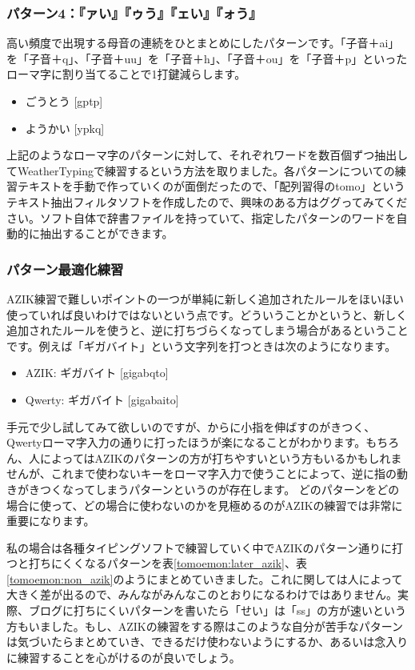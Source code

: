 \subsubsection*{パターン4：『ァい』『ゥう』『ェい』『ォう』}
高い頻度で出現する母音の連続をひとまとめにしたパターンです。「子音＋ai」を「子音＋q」、「子音＋uu」を「子音＋h」、「子音＋ou」を「子音＋p」といったローマ字に割り当てることで1打鍵減らします。
\begin{itemize}
 \item ごうとう [gptp]
 \item ようかい [ypkq]
\end{itemize}

上記のようなローマ字のパターンに対して、それぞれワードを数百個ずつ抽出してWeatherTypingで練習するという方法を取りました。各パターンについての練習テキストを手動で作っていくのが面倒だったので、「配列習得のtomo」というテキスト抽出フィルタソフトを作成したので、興味のある方はググってみてください。ソフト自体で辞書ファイルを持っていて、指定したパターンのワードを自動的に抽出することができます。

\subsubsection*{パターン最適化練習}
AZIK練習で難しいポイントの一つが単純に新しく追加されたルールをほいほい使っていれば良いわけではないという点です。どういうことかというと、新しく追加されたルールを使うと、逆に打ちづらくなってしまう場合があるということです。例えば「ギガバイト」という文字列を打つときは次のようになります。

\begin{itemize}
 \item AZIK: ギガバイト [gigabqto]
 \item Qwerty: ギガバイト [gigabaito]
\end{itemize}

手元で少し試してみて欲しいのですが、からに小指を伸ばすのがきつく、Qwertyローマ字入力の通りに打ったほうが楽になることがわかります。もちろん、人によってはAZIKのパターンの方が打ちやすいという方もいるかもしれませんが、これまで使わないキーをローマ字入力で使うことによって、逆に指の動きがきつくなってしまうパターンというのが存在します。
どのパターンをどの場合に使って、どの場合に使わないのかを見極めるのがAZIKの練習では非常に重要になります。

私の場合は各種タイピングソフトで練習していく中でAZIKのパターン通りに打つと打ちにくくなるパターンを表\ref{tomoemon:later_azik}、表\ref{tomoemon:non_azik}のようにまとめていきました。これに関しては人によって大きく差が出るので、みんながみんなこのとおりになるわけではありません。実際、ブログに打ちにくいパターンを書いたら「せい」は「ss」の方が速いという方もいました。もし、AZIKの練習をする際はこのような自分が苦手なパターンは気づいたらまとめていき、できるだけ使わないようにするか、あるいは念入りに練習することを心がけるのが良いでしょう。

